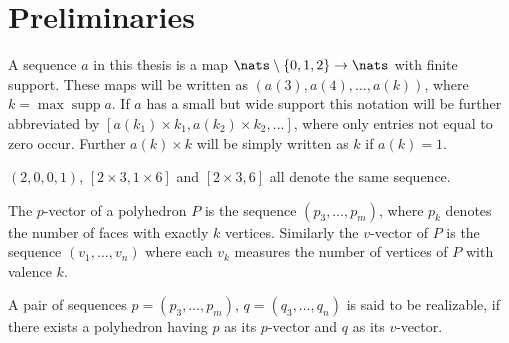 \section{Preliminaries}

\begin{definition}[Sequence]
  A sequence $a$ in this thesis is a map $\nats \setminus \{0, 1, 2\} \rightarrow \nats$ with finite support. These maps will be written as $(a(3), a(4), ..., a(k))$, where $k = \operatorname{max} \operatorname{supp} a$. If $a$ has a small but wide support this notation will be further abbreviated by $[a(k_1) \times k_1, a(k_2) \times k_2, ...]$, where only entries not equal to zero occur. Further $a(k) \times k$ will be simply written as $k$ if $a(k) = 1$.
\end{definition}
\begin{example}
  $(2, 0, 0, 1)$, $[2 \times 3, 1 \times 6]$ and $[2 \times 3, 6]$ all denote the same sequence.
\end{example}
\begin{definition}\label{def:relizable}
  The $p$-vector of a polyhedron $P$ is the sequence $(p_3, \dots, p_m)$, where $p_k$ denotes the number of faces with exactly $k$ vertices. Similarly the $v$-vector of $P$ is the sequence $(v_1, \dots, v_n)$ where each $v_k$ measures the number of vertices of $P$ with valence $k$.
\end{definition}

\begin{definition}\label{def:realizable}
  A pair of sequences $p = (p_3, \dots, p_m)$, $q = (q_3, \dots, q_n)$ is said to be realizable, if there exists a polyhedron having $p$ as its $p$-vector and $q$ as its $v$-vector.
\end{definition}

